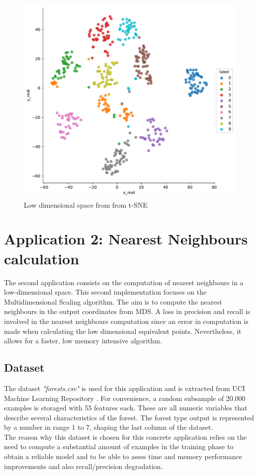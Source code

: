 \documentclass[a4paper,11pt,spanish]{report}
\begin{document}
\begin{figure}[p]
\centering
\includegraphics[width=12cm]{figures/app1plotreal.pdf}
\caption{\label{figureTSNE}Low dimensional space from from t-SNE}
\end{figure}

\newpage

\section{Application 2: Nearest Neighbours calculation}
\label{sec:app2}

The second application consists on the computation of nearest neighbours in a low-dimensional space. This second implementation focuses on the Multidimensional Scaling algorithm. The aim is to compute the nearest neighbours in the output coordinates from MDS. A loss in precision and recall is involved in the nearest neighbours computation since an error in computation is made when calculating the low dimensional equivalent points. Nevertheless, it allows for a faster, low memory intensive algorithm.

\subsection{Dataset}
\label{ssec:data2}

The dataset \textit{"forests.csv"} is used for this application and is extracted from UCI Machine Learning Repository \citep{ucidata}. For convenience, a random subsample of 20.000 examples is storaged with 55 features each. These are all numeric variables that describe several characteristics of the forest. The forest type output is represented by a number in range 1 to 7, shaping the last column of the dataset.\\
The reason why this dataset is chosen for this concrete application relies on the need to compute a substantial amount of examples in the training phase to obtain a reliable model and to be able to asses time and memory performance improvements and also recall/precision degradation.
\end{document}
